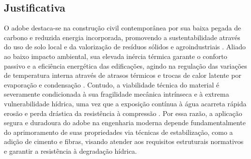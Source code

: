 \subsection{Justificativa}



    O adobe destaca-se na construção civil contemporânea por sua baixa pegada de carbono e reduzida energia incorporada, promovendo a sustentabilidade através do uso de solo local e da valorização de resíduos sólidos e agroindustriais \cite{Arduin2022, Khunaprapakorn2025, Arduin2024, Aspillaga2024}. Aliado ao baixo impacto ambiental, sua elevada inércia térmica garante o conforto passivo e a eficiência energética das edificações, agindo na regulação das variações de temperatura interna através de atrasos térmicos e trocas de calor latente por evaporação e condensação \cite{Christoforou2016, Heracleous2023, Rincon2019, Khunaprapakorn2025, Giada2019}. Contudo, a viabilidade técnica do material é severamente condicionada à sua fragilidade mecânica intrínseca e à extrema vulnerabilidade hídrica, uma vez que a exposição contínua à água acarreta rápida erosão e perda drástica da resistência à compressão \cite{Brito2023, Dormohamadi2020, Fages2022,Dao2018,Day1993, Dormohamadi2024}. Por essa razão, a aplicação segura e duradoura do adobe na engenharia moderna depende fundamentalmente do aprimoramento de suas propriedades via técnicas de estabilização, como a adição de cimento e fibras, visando atender aos requisitos estruturais normativos e garantir a resistência à degradação hídrica.


